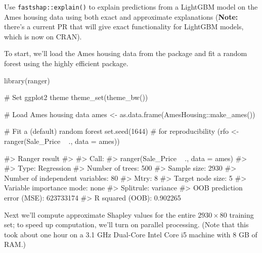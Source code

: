 Use \texttt{fastshap::explain()} to explain predictions from a LightGBM
model on the Ames housing data using both exact and approximate
explanations (\textbf{Note:} there's a current PR that will give exact
functionality for LightGBM models, which is now on CRAN).

To start, we'll load the Ames housing data from the
 package \citep{R-AmesHousing} and fit a random
forest using the highly efficient  \citep{R-ranger}
package.

\begin{Schunk}
\begin{Sinput}
library(ranger)

# Set ggplot2 theme
theme_set(theme_bw())

# Load Ames housing data
ames <- as.data.frame(AmesHousing::make_ames())

# Fit a (default) random forest
set.seed(1644)  # for reproducibility
(rfo <- ranger(Sale_Price ~ ., data = ames))
\end{Sinput}
\begin{Soutput}
#> Ranger result
#> 
#> Call:
#>  ranger(Sale_Price ~ ., data = ames) 
#> 
#> Type:                             Regression 
#> Number of trees:                  500 
#> Sample size:                      2930 
#> Number of independent variables:  80 
#> Mtry:                             8 
#> Target node size:                 5 
#> Variable importance mode:         none 
#> Splitrule:                        variance 
#> OOB prediction error (MSE):       623733174 
#> R squared (OOB):                  0.902265
\end{Soutput}
\end{Schunk}

Next we'll compute approximate Shapley values for the entire
\(2930 \times 80\) training set; to speed up computation, we'll turn on
parallel processing. (Note that this took about one hour on a 3.1 GHz
Dual-Core Intel Core i5 machine with 8 GB of RAM.)

\begin{Schunk}
\end{Schunk}

